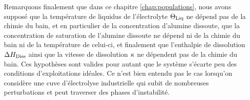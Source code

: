 Remarquons finalement que dans ce chapitre \ref{chap:populations},
nous avons supposé que la température de liquidus de l'électrolyte
$\Theta_\text{Liq}$ ne dépend pas de la chimie du bain, et en particulier de la
concentration d'alumine dissoute, que la concentration de saturation
de l'alumine dissoute ne dépend ni de la chimie du bain ni de la
température de celui-ci, et finalement que l'enthalpie de dissolution
$\Delta H_\text{Diss}$ ainsi que la vitesse de dissolution
$\kappa$ ne dépendent pas de la chimie du bain. Ces
hypothèses sont valides pour autant que le système s'écarte peu des
conditions d'exploitations idéales. Ce n'est bien entendu pas le cas
lorsqu'on considère une cuve d'électrolyse industrielle qui subit de
nombreuses perturbations et peut traverser des phases d'instabilité.
